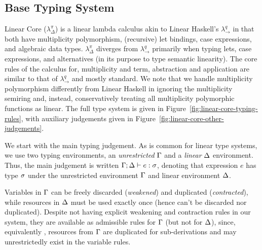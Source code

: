 \documentclass[acmsmall,review,anonymous,screen]{acmart}
\begin{document}


\subsection{Base Typing System\label{sec:base-calculi}}

Linear Core ($\lambda^\pi_\Delta$) is a linear lambda calculus akin to Linear
Haskell's $\lambda^q_\to$ in that both have multiplicity polymorphism,
(recursive) let bindings, case expressions, and algebraic data types.
$\lambda^\pi_\Delta$ diverges from $\lambda^q_\to$ primarily when typing lets,
case expressions, and alternatives (in its purpose to type semantic linearity).
%
%
%
The core rules of the calculus for, multiplicity and term,
abstraction and application are similar to that of $\lambda^q_\to$ and
mostly standard. 
We note that we handle multiplicity polymorphism differently from
Linear Haskell in ignoring the multiplicity semiring and, instead,
conservatively treating all multiplicity polymorphic functions as linear.
%
The full type system is given in Figure~\ref{fig:linear-core-typing-rules},
with auxiliary judgements given in
Figure~\ref{fig:linear-core-other-judgements}.

\TypingRules
\TypingRulesOther

We start with the main typing judgement.
As is common for linear type
systems, we use two typing environments, an \emph{unrestricted} $\Gamma$ and
a \emph{linear} $\Delta$ environment.
Thus, the main judgement is written $\Gamma;\Delta \vdash e :
\sigma$,
denoting that expression $e$ has type $\sigma$ under
the unrestricted environment $\Gamma$ and linear environment $\Delta$.

%
Variables in $\Gamma$ can be freely discarded (\emph{weakened}) and
duplicated (\emph{contracted}), while resources in $\Delta$ must be used
exactly once (hence can't be discarded nor duplicated). Despite not
having explicit weakening and contraction rules in our system, they
are available as admissible rules for $\Gamma$ (but not for $\Delta$), since,
equivalently \cite{91621fae-5e53-3497-8291-32b2fab5a743}, resources
from $\Gamma$ are duplicated for sub-derivations and may unrestrictedly
exist in the variable rules.
%
\end{document}
